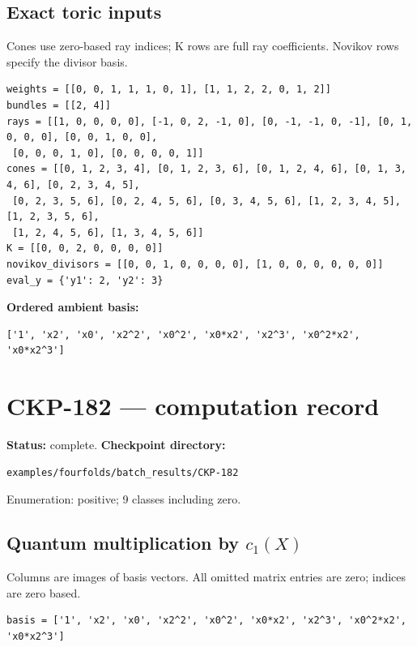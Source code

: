 \documentclass[10pt,a4paper]{article}
\begin{document}
\subsection*{Exact toric inputs}
Cones use zero-based ray indices; K rows are full ray coefficients. Novikov rows specify the divisor basis.

\begin{lstlisting}
weights = [[0, 0, 1, 1, 1, 0, 1], [1, 1, 2, 2, 0, 1, 2]]
bundles = [[2, 4]]
rays = [[1, 0, 0, 0, 0], [-1, 0, 2, -1, 0], [0, -1, -1, 0, -1], [0, 1, 0, 0, 0], [0, 0, 1, 0, 0],
 [0, 0, 0, 1, 0], [0, 0, 0, 0, 1]]
cones = [[0, 1, 2, 3, 4], [0, 1, 2, 3, 6], [0, 1, 2, 4, 6], [0, 1, 3, 4, 6], [0, 2, 3, 4, 5],
 [0, 2, 3, 5, 6], [0, 2, 4, 5, 6], [0, 3, 4, 5, 6], [1, 2, 3, 4, 5], [1, 2, 3, 5, 6],
 [1, 2, 4, 5, 6], [1, 3, 4, 5, 6]]
K = [[0, 0, 2, 0, 0, 0, 0]]
novikov_divisors = [[0, 0, 1, 0, 0, 0, 0], [1, 0, 0, 0, 0, 0, 0]]
eval_y = {'y1': 2, 'y2': 3}
\end{lstlisting}

\textbf{Ordered ambient basis:}
\begin{lstlisting}
['1', 'x2', 'x0', 'x2^2', 'x0^2', 'x0*x2', 'x2^3', 'x0^2*x2', 'x0*x2^3']
\end{lstlisting}

\clearpage\section*{CKP-182 --- computation record}
\textbf{Status:} complete.
\textbf{Checkpoint directory:}
\begin{lstlisting}
examples/fourfolds/batch_results/CKP-182
\end{lstlisting}

Enumeration: positive; 9 classes including zero.
\subsection*{Quantum multiplication by $c_1(X)$}
Columns are images of basis vectors. All omitted matrix entries are zero; indices are zero based.

\begin{lstlisting}
basis = ['1', 'x2', 'x0', 'x2^2', 'x0^2', 'x0*x2', 'x2^3', 'x0^2*x2', 'x0*x2^3']
\end{lstlisting}
\end{document}
